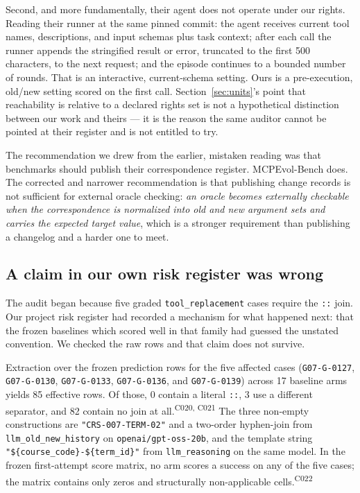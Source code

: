 \documentclass[11pt]{article}
\newcommand{\ledger}[1]{\textsuperscript{\textsf{\scriptsize #1}}}
\newcommand{\dfam}[1]{\texttt{#1}}
\begin{document}
Second, and more fundamentally, their agent does not operate under our rights.
Reading their runner at the same pinned commit: the agent receives current tool
names, descriptions, and input schemas plus task context; after each call the
runner appends the stringified result or error, truncated to the first 500
characters, to the next request; and the episode continues to a bounded number
of rounds. That is an interactive, current-schema setting. Ours is a
pre-execution, old/new setting scored on the first call. Section~\ref{sec:units}'s
point that reachability is relative to a declared rights set is not a
hypothetical distinction between our work and theirs --- it is the reason the
same auditor cannot be pointed at their register and is not entitled to try.

The recommendation we drew from the earlier, mistaken reading was that
benchmarks should publish their correspondence register. MCPEvol-Bench does.
The corrected and narrower recommendation is that publishing change records is
not sufficient for external oracle checking: \emph{an oracle becomes externally
checkable when the correspondence is normalized into old and new argument sets
and carries the expected target value}, which is a stronger requirement than
publishing a changelog and a harder one to meet.

\subsection{A claim in our own risk register was wrong}
\label{sec:risk0022}

The audit began because five graded \dfam{tool\_replacement} cases require the
\texttt{::} join. Our project risk register had recorded a mechanism for what
happened next: that the frozen baselines which scored well in that family had
guessed the unstated convention. We checked the raw rows and that claim does
not survive.

Extraction over the frozen prediction rows for the five affected cases
(\texttt{G07-G-0127}, \texttt{G07-G-0130},
\texttt{G07-G-0133}, \texttt{G07-G-0136}, and
\texttt{G07-G-0139}) across 17 baseline arms yields 85
effective rows. Of those, 0 contain a literal \texttt{::}, 3 use a different
separator, and 82 contain no join at all.\ledger{C020, C021} The three
non-empty constructions are \texttt{"CRS-007-TERM-02"} and a two-order
hyphen-join from \texttt{llm\_old\_new\_history} on \texttt{openai/gpt-oss-20b},
and the template string \texttt{"\$\{course\_code\}-\$\{term\_id\}"} from
\texttt{llm\_reasoning} on the same model. In the frozen first-attempt score
matrix, no arm scores a success on any of the five cases; the matrix contains
only zeros and structurally non-applicable cells.\ledger{C022}
\end{document}
